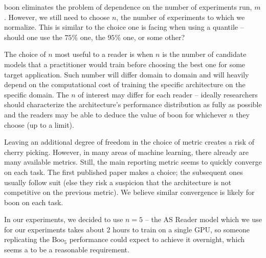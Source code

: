 \documentclass{article}
\newcommand{\boo}[1]{\text{Boo}_{#1}}
\newcommand{\tboon}{\gls{boon}\xspace}
\newcommand{\Em}[1]{\boo{#1}}
\newcommand{\emn}{\Em{n}}
\begin{document}
\tboon eliminates the problem of dependence on the number of experiments run, $m$. However, we still need to choose $n$, the number of experiments to which we normalize. This is similar to the choice one is facing when using a quantile -- should one use the $75\%$ one, the $95\%$ one, or some other? 

The choice of $n$ most useful to a reader is when $n$ is the number of candidate models that a practitioner would train before choosing the best one for some target application. Such number will differ domain to domain and will heavily depend on the computational cost of training the specific architecture on the specific domain. The $n$ of interest may differ for each reader -- ideally researchers should characterize the architecture's performance distribution as fully as possible and the readers may be able to deduce the value of \tboon for whichever $n$ they choose (up to a limit).

Leaving an additional degree of freedom in the choice of metric creates a risk of cherry picking. However, in many areas of machine learning, there already are many available metrics. Still, the main reporting metric seems to quickly converge on each task. The first published paper makes a choice; the subsequent ones usually follow suit (else they risk a suspicion that the architecture is not competitive on the previous metric). We believe similar convergence is likely for \tboon on each task.

In our experiments, we decided to use $n=5$ -- the AS Reader model which we use for our experiments takes about 2 hours to train on a single GPU, so someone replicating the $\boo{5}$ performance could expect to achieve it overnight, which seems a to be a reasonable requirement.

\end{document}
